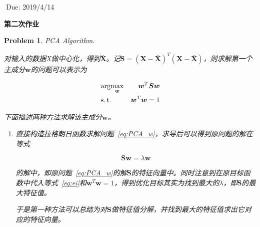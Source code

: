 \documentclass[UTF8]{article}
\newtheorem{hw}{Problem}
\newenvironment{sol}
\DeclareMathOperator{\mst}{s.t.}
\newcommand{\argmax}{\arg\!\max}
\newcommand{\Smat}[0]{{{\boldsymbol S}}}
\newcommand{\Xmat}{{\boldsymbol X}}
\newcommand{\wv}{\boldsymbol{w}}
\begin{document}
$\;$\hfill Due: 2019/4/14



\begin{center}

{\LARGE\bf 第二次作业}

\end{center}





\begin{hw}

PCA Algorithm.



\begin{sol}

	对输入的数据X做中心化，得到$\bar{\Xmat}$。记$\Smat=(\Xmat-\bar{\Xmat})^T(\Xmat-\bar{\Xmat})$，则求解第一个主成分$\wv$的问题可以表示为

	\begin{equation}

	\label{eq:PCA_w}

	\begin{aligned}

		&\argmax_{\wv} &\wv^T\Smat\wv\\

		&\mst &\wv^T\wv=1

	\end{aligned}

	\end{equation}

	

	下面描述两种方法求解该主成分$\wv$。

	\begin{enumerate}

		\item[(1)]{

			直接构造拉格朗日函数求解问题~\eqref{eq:PCA_w}，求导后可以得到原问题的解在等式

			\begin{equation}

				\label{eq:ei}

				\Smat\wv = \lambda \wv

			\end{equation}

			的解中，即原问题~\eqref{eq:PCA_w}的解$\Smat$的特征向量中。同时注意到在原目标函数中代入等式~\eqref{eq:ei}和$\wv^T\wv=1$，得到优化目标其实为找到最大的$\lambda$，即$\Smat$的最大特征值。

			于是第一种方法可以总结为对$\Smat$做特征值分解，并找到最大的特征值求出它对应的特征向量。

}
\end{enumerate}
\end{sol}
\end{hw}
\end{document}
